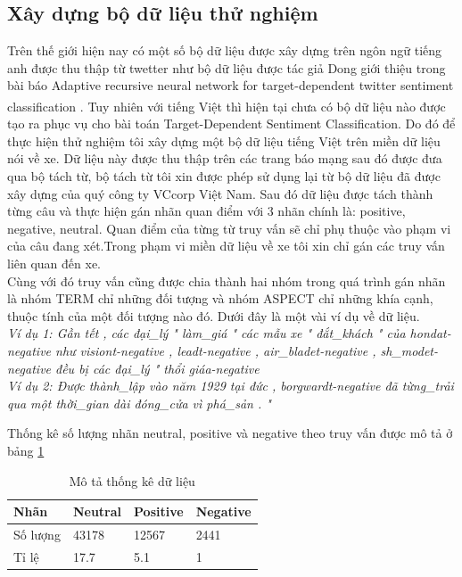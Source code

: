 \documentclass[fontsize=12pt]{scrartcl}
\begin{document}
\subsection{Xây dựng bộ dữ liệu thử nghiệm}
Trên thế giới hiện nay có một số bộ dữ liệu được xây dựng trên ngôn ngữ tiếng anh được thu thập từ twetter như bộ dữ liệu được tác giả Dong giới thiệu trong bài báo  Adaptive recursive neural network for target-dependent twitter sentiment classification \textsuperscript{\cite{dongadaptive}}. Tuy nhiên với tiếng Việt thì hiện tại chưa có bộ dữ liệu nào được tạo ra phục vụ cho bài toán Target-Dependent Sentiment Classification. Do đó để thực hiện thử nghiệm tôi xây dựng một bộ dữ liệu tiếng Việt trên miền dữ liệu nói về xe. Dữ liệu này được thu thập trên các trang báo mạng sau đó được đưa qua bộ tách từ, bộ tách từ tôi xin được phép sử dụng lại từ bộ dữ liệu đã được xây dựng của quý công ty VCcorp Việt Nam. Sau đó dữ liệu được tách thành từng câu và thực hiện gán nhãn quan điểm với 3 nhãn chính là: positive, negative, neutral. Quan điểm của từng từ truy vấn sẽ chỉ phụ thuộc vào phạm vi của câu đang xét.Trong phạm vi miền dữ liệu về xe tôi xin chỉ gán các truy vấn liên quan đến xe.\\
Cùng với đó truy vấn cũng được chia thành hai nhóm trong quá trình gán nhãn là nhóm TERM chỉ những đối tượng và nhóm ASPECT chỉ những khía cạnh, thuộc tính của một đối tượng nào đó. Dưới đây là một vài ví dụ về dữ liệu.\\
\textit{
Ví dụ 1: Gần tết , các đại\_lý " làm\_giá " các mẫu xe " đắt\_khách " của honda{t-negative} như vision{t-negative} , lead{t-negative} , air\_blade{t-negative} , sh\_mode{t-negative} đều bị các đại\_lý " thổi giá{a-negative} \\
Ví dụ 2: Được thành\_lập vào năm 1929 tại đức , borgward{t-negative} đã từng\_trải qua một thời\_gian dài đóng\_cửa vì phá\_sản .
" }
\par
Thống kê số lượng nhãn neutral, positive và negative theo truy vấn được mô tả ở bảng \ref{table:data_des}
\begin{table}[ht]
\begin{center}
  \begin{tabular}{|l|l|l|l|}
\hline
Nhãn & Neutral & Positive & Negative\\
\hline
Số lượng & 43178 & 12567 & 2441\\
\hline
Tỉ lệ & 17.7 & 5.1 & 1\\
\hline
  \end{tabular}
  \end{center}
  \caption{Mô tả thống kê dữ liệu}
  \label{table:data_des}
\end{table}%
\end{document}
